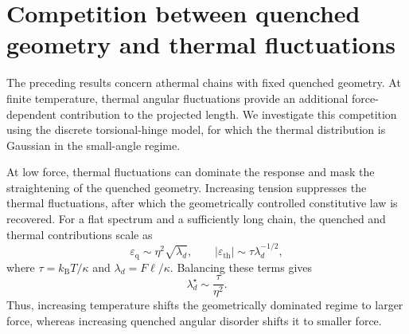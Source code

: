 \documentclass[pdflatex, twocolumn, sn-nature]{sn-jnl}
\begin{document}



\section{Competition between quenched geometry and thermal fluctuations}
\label{sec:thermal_main}

The preceding results concern athermal chains with fixed quenched geometry. At finite temperature, thermal angular fluctuations provide an additional force-dependent contribution to the projected length. We investigate this competition using the discrete torsional-hinge model, for which the thermal distribution is Gaussian in the small-angle regime.

At low force, thermal fluctuations can dominate the response and mask the straightening of the quenched geometry. Increasing tension suppresses the thermal fluctuations, after which the geometrically controlled constitutive law is recovered. For a flat spectrum and a sufficiently long chain, the quenched and thermal contributions scale as
\begin{equation}
\varepsilon_{\mathrm q}
\sim
\eta^2\sqrt{\lambda_d},
\qquad
\left|\varepsilon_{\mathrm{th}}\right|
\sim
\tau\lambda_d^{-1/2},
\end{equation}
where $\tau=k_{\mathrm B}T/\kappa$ and $\lambda_d=F\ell/\kappa$. Balancing these terms gives
\begin{equation}
\lambda_d^\star
\sim
\frac{\tau}{\eta^2}.
\label{eq:thermal_crossover_main}
\end{equation}
Thus, increasing temperature shifts the geometrically dominated regime to larger force, whereas increasing quenched angular disorder shifts it to smaller force.
\end{document}
